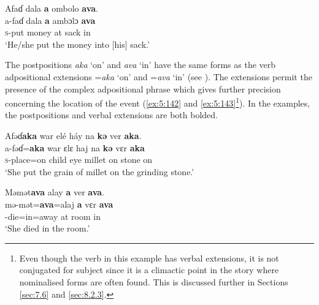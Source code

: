 \ea \label{ex:5:141}
Afaɗ  dala  \textbf{a}  ombolo  \textbf{ava}.\\
\gll  a-faɗ  dala  \textbf{a}  ambɔlɔ  \textbf{ava}\\
      \textsc{s}-put  money  at  sack  in\\
\glt  ‘He/she put the money into [his] sack.’
\z

The postpositions \textit{aka} ‘on’ and \textit{ava} ‘in’ have the same forms as the verb adpositional extensions =\textit{aka} ‘on’ and =\textit{ava}  ‘in’ (see ). The extensions permit the presence of the complex adpositional phrase which gives further precision concerning the location of the event (\ref{ex:5:142} and \ref{ex:5:143}\footnote{Even though the verb in this example has verbal extensions, it is not conjugated for subject since it is a climactic point in the story where nominalised forms are often found.  This is discussed further in Sections \ref{sec:7.6} and \ref{sec:8.2.3}.}). In the examples, the postpositions and verbal extensions are both bolded. 

\ea \label{ex:5:142}
Afəɗ\textbf{aka}  war  elé  háy  na  \textbf{kə}  ver  \textbf{aka}.\\
\gll  a-fəɗ=\textbf{aka}  war  ɛlɛ  haj  na  \textbf{kə}  vɛr  \textbf{aka}\\
      \textsc{s}-place=on  child  eye  millet  {\PSP}  on  stone  on\\
\glt  ‘She put the grain of millet on the grinding stone.’
\z


\ea \label{ex:5:143}
Məmət\textbf{ava}  alay  \textbf{a}  ver  \textbf{ava}.\\
\gll  mə-mət=\textbf{ava}=alaj  \textbf{a}   vɛr   \textbf{ava}\\
      {\NOM}{}-die=in=away  at  room  in\\
\glt  ‘She died in the room.’  
\z